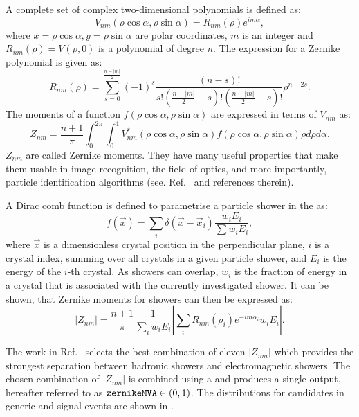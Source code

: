 A complete set of complex two-dimensional polynomials is defined as:
\begin{equation}
    V_{nm}(\rho\cos\alpha,\rho\sin\alpha) = R_{nm}(\rho)e^{im\alpha},
\end{equation}
where ${x=\rho\cos\alpha, y=\rho\sin\alpha}$ are polar coordinates, $m$ is an integer and $R_{nm}(\rho)=V(\rho,0)$ is a polynomial of degree $n$.
The expression for a Zernike polynomial is given as:
\begin{equation}
    R_{nm}(\rho) = \sum^{\frac{n-|m|}{2}}_{s=0}(-1)^s \frac{(n-s)!}{ s! \left(\frac{n+|m|}{2}-s \right) ! \left( \frac{n-|m|}{2}-s\right) !}\rho^{n-2s}.
\end{equation}
The moments of a function $f(\rho\cos\alpha,\rho\sin\alpha)$ are expressed in terms of $V_{nm}$ as:
\begin{equation}
    Z_{nm} = \frac{n+1}{\pi} \int_0^{2\pi}\int^1_0 V^*_{nm}(\rho\cos\alpha,\rho\sin\alpha)f(\rho\cos\alpha, \rho\sin\alpha)\rho d\rho d\alpha.
\end{equation}
$Z_{nm}$ are called Zernike moments.
They have many useful properties that make them usable in image recognition, the field of optics, and more importantly, particle identification algorithms (see. Ref.~\cite{Hershenhorn:2468} and references therein).

A Dirac comb function is defined to parametrise a particle shower in the \ECL as:
\begin{equation}
    f(\vec{x}) = \sum_i \delta(\vec{x}-\vec{x}_i)\frac{w_iE_i}{\sum w_iE_i},
\end{equation}
where $\vec{x}$ is a dimensionless crystal position in the perpendicular plane, $i$ is a crystal index, summing over all crystals in a given particle shower, and $E_i$ is the energy of the $i$-th crystal.
As showers can overlap, $w_i$ is the fraction of energy in a crystal that is associated with the currently investigated shower.
It can be shown, that Zernike moments for \ECL showers can then be expressed as:
\begin{equation}
    |Z_{nm}| = \frac{n+1}{\pi}\frac{1}{\sum_iw_iE_i}\left|\sum_iR_{nm}(\rho_i)e^{-im\alpha_i}w_iE_i\right|.
\end{equation}

The work in Ref.~\cite{Hershenhorn:2468} selects the best combination of eleven $|Z_{nm}|$ which provides the strongest separation between hadronic showers and electromagnetic showers.
The chosen combination of $|Z_{nm}|$ is combined using a \BDT and produces a single output, hereafter referred to as ${\texttt{zernikeMVA}}\in(0,1)$.
The \ZMVA distributions for \BtoXsgamma candidates in generic \MC and signal \MC events are shown in .

